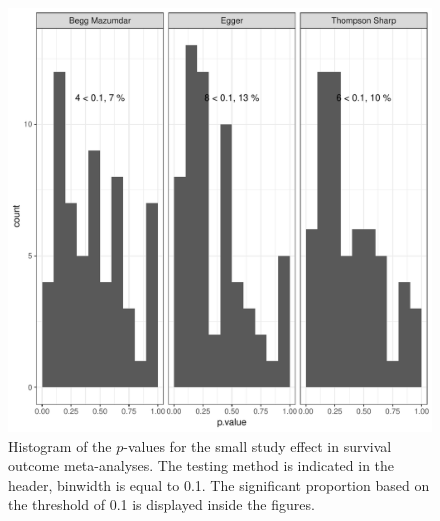 \documentclass[11pt,a4paper,twoside]{book}\usepackage[]{graphicx}\usepackage[]{color}
\makeatletter
\def\maxwidth{ %
  \ifdim\Gin@nat@width>\linewidth
    \linewidth
  \else
    \Gin@nat@width
  \fi
}
\newenvironment{knitrout}{}{} %
\makeatother
\begin{document}
\begin{figure}
\begin{knitrout}
\color{fgcolor}
\includegraphics[width=\maxwidth]{figure/unnamed-chunk-15-1} 

\end{knitrout}
\caption{Histogram of the $p$-values for the small study effect in survival outcome meta-analyses. The testing method is indicated in the header, binwidth is equal to 0.1. The significant proportion based on the threshold of 0.1 is displayed inside the figures.}
\label{fig:test.surv}
\end{figure}



\subsection{}




















\end{document}

